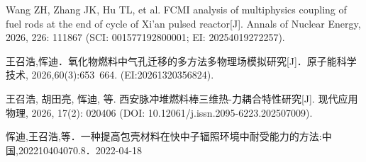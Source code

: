 \begin{achievelist}
    \item Wang ZH, Zhang JK, Hu TL, et al. FCMI analysis of multiphysics coupling of fuel rods at the end of cycle of Xi’an pulsed reactor[J]. Annals of Nuclear Energy, 2026, 226: 111867 (SCI: 001577192800001; EI: 20254019272257).
    \item 王召浩,恽迪．氧化物燃料中气孔迁移的多方法多物理场模拟研究[J]．原子能科学技术, 2026,60(3):653~664. (EI:20261320356824).
    \item 王召浩, 胡田亮, 恽迪, 等. 西安脉冲堆燃料棒三维热-力耦合特性研究[J]. 现代应用物理, 2026, 17(2): 020406 (DOI: 10.12061/j.issn.2095-6223.202507009).
    \item 恽迪,王召浩,等．一种提高包壳材料在快中子辐照环境中耐受能力的方法:中国,202210404070.8\allowbreak [P]．2022-04-18
\end{achievelist}